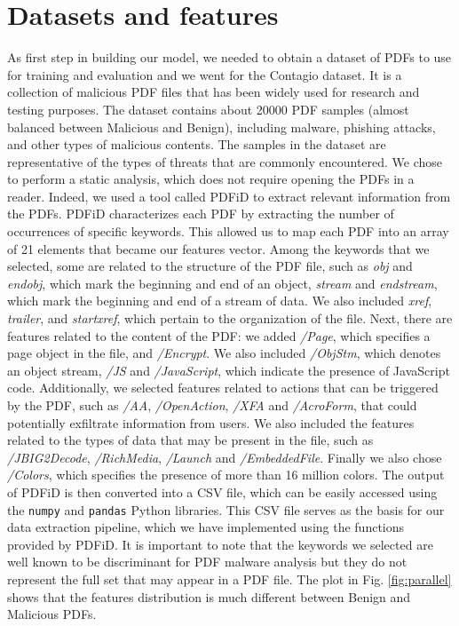 \documentclass[twocolumn, switch]{article} %
\begin{document}
\section{Datasets and features}
\label{sec:datasetsandfeatures}
As first step in building our model, we needed to obtain a dataset of PDFs to use for training and evaluation and we went for the Contagio dataset. It is a collection of malicious PDF files that has been widely used for research and testing purposes. The dataset contains about 20000 PDF samples (almost balanced between Malicious and Benign), including malware, phishing attacks, and other types of malicious contents. The samples in the dataset are representative of the types of threats that are commonly encountered.\newline
We chose to perform a static analysis, which does not require opening the PDFs in a reader. Indeed, we used a tool called PDFiD to extract relevant information from the PDFs. PDFiD characterizes each PDF by extracting the number of occurrences of specific keywords. This allowed us to map each PDF into an array of 21 elements that became our features vector.\newline
Among the keywords that we selected, some are related to the structure of the PDF file, such as \textit{obj} and \textit{endobj}, which mark the beginning and end of an object, \textit{stream} and \textit{endstream}, which mark the beginning and end of a stream of data. We also included \textit{xref}, \textit{trailer}, and \textit{startxref}, which pertain to the organization of the file. Next, there are features related to the content of the PDF: we added \textit{/Page}, which specifies a page object in the file, and \textit{/Encrypt}. We also included \textit{/ObjStm}, which denotes an object stream, \textit{/JS} and \textit{/JavaScript}, which indicate the presence of JavaScript code. Additionally, we selected features related to actions that can be triggered by the PDF, such as \textit{/AA}, \textit{/OpenAction}, \textit{/XFA} and \textit{/AcroForm}, that could potentially exfiltrate information from users. We also included the features related to the types of data that may be present in the file, such as \textit{/JBIG2Decode}, \textit{/RichMedia}, \textit{/Launch} and \textit{/EmbeddedFile}. Finally we also chose \textit{/Colors}, which specifies the presence of more than 16 million colors.\newline
The output of PDFiD is then converted into a CSV file, which can be easily accessed using the \texttt{numpy} and \texttt{pandas} Python libraries. This CSV file serves as the basis for our data extraction pipeline, which we have implemented using the functions provided by PDFiD. It is important to note that the keywords we selected are well known to be discriminant for PDF malware analysis but they do not represent the full set that may appear in a PDF file.\newline
The plot in Fig. \ref{fig:parallel} shows that the features distribution is much different between Benign and Malicious PDFs.
\end{document}
